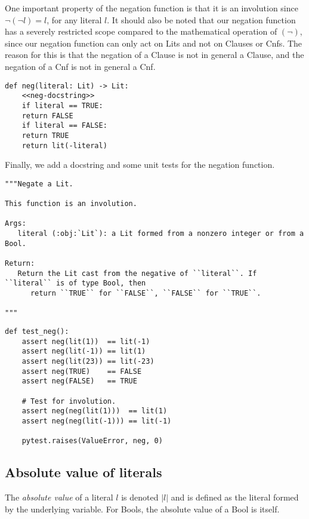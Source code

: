 \documentclass[11pt]{article}
\begin{document}
One important property of the negation function is that it is an involution
since \(\neg(\neg l) = l\), for any literal \(l\). It should also be noted
that our negation function has a severely restricted scope compared to the
mathematical operation of \((\neg)\), since our negation function can only
act on Lits and not on Clauses or Cnfs. The reason for this is that the
negation of a Clause is not in general a Clause, and the negation of a Cnf
is not in general a Cnf.

\begin{verbatim}
def neg(literal: Lit) -> Lit:
    <<neg-docstring>>
    if literal == TRUE:
	return FALSE
    if literal == FALSE:
	return TRUE
    return lit(-literal)
\end{verbatim}

Finally, we add a docstring and some unit tests for the negation function.

\begin{verbatim}
"""Negate a Lit.

This function is an involution.

Args:
   literal (:obj:`Lit`): a Lit formed from a nonzero integer or from a Bool.

Return:
   Return the Lit cast from the negative of ``literal``. If ``literal`` is of type Bool, then
      return ``TRUE`` for ``FALSE``, ``FALSE`` for ``TRUE``.

"""
\end{verbatim}


\begin{verbatim}
def test_neg():
    assert neg(lit(1))  == lit(-1)
    assert neg(lit(-1)) == lit(1)
    assert neg(lit(23)) == lit(-23)
    assert neg(TRUE)    == FALSE
    assert neg(FALSE)   == TRUE

    # Test for involution.
    assert neg(neg(lit(1)))  == lit(1)
    assert neg(neg(lit(-1))) == lit(-1)

    pytest.raises(ValueError, neg, 0)
\end{verbatim}

\subsection{Absolute value of literals}
\label{sec:org013fa51}
The \emph{absolute value} of a literal \(l\) is denoted \(|l|\) and is defined
as the literal formed by the underlying variable. For Bools, the absolute
value of a Bool is itself.
\end{document}
